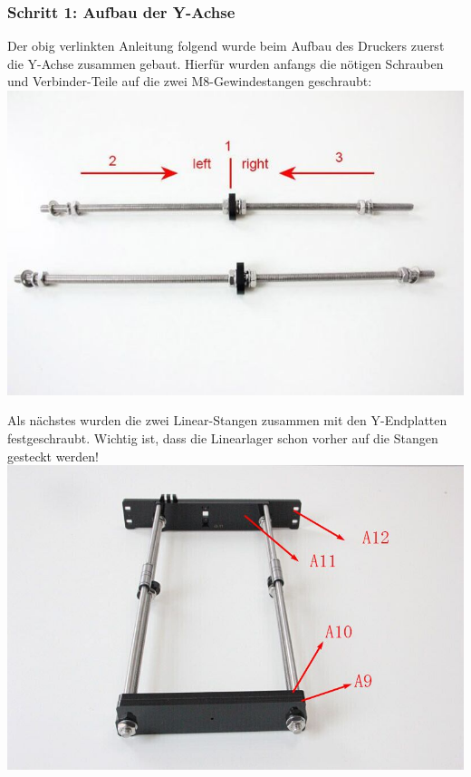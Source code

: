 \newpage
\subsubsection{Schritt 1: Aufbau der Y-Achse}
Der obig verlinkten Anleitung folgend wurde beim Aufbau des Druckers zuerst die Y-Achse zusammen gebaut.
Hierfür wurden anfangs die nötigen Schrauben und Verbinder-Teile auf die zwei M8-Gewindestangen geschraubt:
\includegraphics[clip=true,trim=0 100 0 40,width=\textwidth]{Bilder/Y_Assembly_Tutorial_1.jpg}

Als nächstes wurden die zwei Linear-Stangen zusammen mit den Y-Endplatten festgeschraubt. Wichtig ist, dass die Linearlager schon vorher auf die Stangen gesteckt werden!\\
\includegraphics[width=\textwidth]{Bilder/Y_Assembly_Tutorial_2.jpg}
